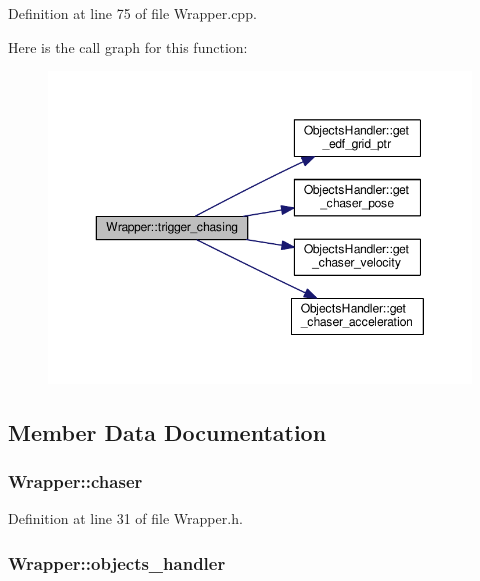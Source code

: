 Definition at line 75 of file Wrapper.\+cpp.



Here is the call graph for this function\+:
\nopagebreak
\begin{figure}[H]
\begin{center}
\leavevmode
\includegraphics[width=350pt]{class_wrapper_a2da6448c77dd4edb054de4130b1fc883_cgraph}
\end{center}
\end{figure}




\subsection{Member Data Documentation}
\subsubsection[{\texorpdfstring{chaser}{chaser}}]{ Wrapper\+::chaser}\hypertarget{class_wrapper_a750309ad3470e20a80e9d72b0d7e34cb}{}\label{class_wrapper_a750309ad3470e20a80e9d72b0d7e34cb}


Definition at line 31 of file Wrapper.\+h.

\subsubsection[{\texorpdfstring{objects\+\_\+handler}{objects_handler}}]{ Wrapper\+::objects\+\_\+handler}\hypertarget{class_wrapper_a8cddd5ffbaeb5ab0b5d8d8d0c74f810f}{}\label{class_wrapper_a8cddd5ffbaeb5ab0b5d8d8d0c74f810f}


